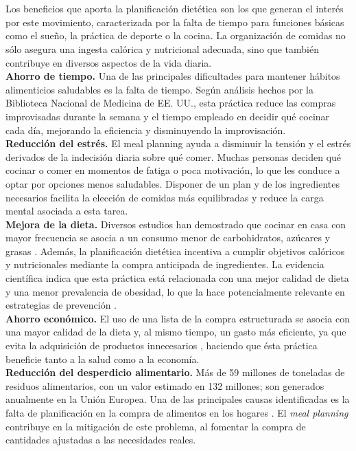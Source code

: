 \documentclass[12pt,a4paper]{report} %
\begin{document}
	\\\\
	Los beneficios que aporta la planificación dietética son los que generan el interés por este movimiento, caracterizada por la falta de tiempo para funciones básicas como el sueño, la práctica de deporte o la cocina. La organización de comidas no sólo asegura una ingesta calórica y nutricional adecuada, sino que también contribuye en diversos aspectos de la vida diaria.\\
	\textbf{Ahorro de tiempo.} Una de las principales dificultades para mantener hábitos alimenticios saludables es la falta de tiempo. Según análisis hechos por la Biblioteca Nacional de Medicina de EE. UU., esta práctica reduce las compras improvisadas durante la semana y el tiempo empleado en decidir qué cocinar cada día, mejorando la eficiencia y disminuyendo la improvisación.
	\\
	\textbf{Reducción del estrés.} El meal planning ayuda a disminuir la tensión y el estrés derivados de la indecisión diaria sobre qué comer. Muchas personas deciden qué cocinar o comer en momentos de fatiga o poca motivación, lo que les conduce a optar por opciones menos saludables. Disponer de un plan y de los ingredientes necesarios facilita la elección de comidas más equilibradas y reduce la carga mental asociada a esta tarea.
	\\
	\textbf{Mejora de la dieta.} Diversos estudios han demostrado que cocinar en casa con mayor frecuencia se asocia a un consumo menor de carbohidratos, azúcares y grasas \cite{johnshopkins2014}. Además, la planificación dietética incentiva a cumplir objetivos calóricos y nutricionales mediante la compra anticipada de ingredientes. La evidencia científica indica que esta práctica está relacionada con una mejor calidad de dieta y una menor prevalencia de obesidad, lo que la hace potencialmente relevante en estrategias de prevención \cite{ducrot2017}.
	\\
	\textbf{Ahorro económico.} El uso de una lista de la compra estructurada se asocia con una mayor calidad de la dieta y, al mismo tiempo, un gasto más eficiente, ya que evita la adquisición de productos innecesarios \cite{jneb2017}, haciendo que ésta práctica beneficie tanto a la salud como a la economía.
	\\
	\textbf{Reducción del desperdicio alimentario.} Más de 59 millones de toneladas de residuos alimentarios, con un valor estimado en 132 millones; son generados anualmente en la Unión Europea. Una de las principales causas identificadas es la falta de planificación en la compra de alimentos en los hogares \cite{europeancommission2020}. El \textit{meal planning} contribuye en la mitigación de este problema, al fomentar la compra de cantidades ajustadas a las necesidades reales.
	
\end{document}
